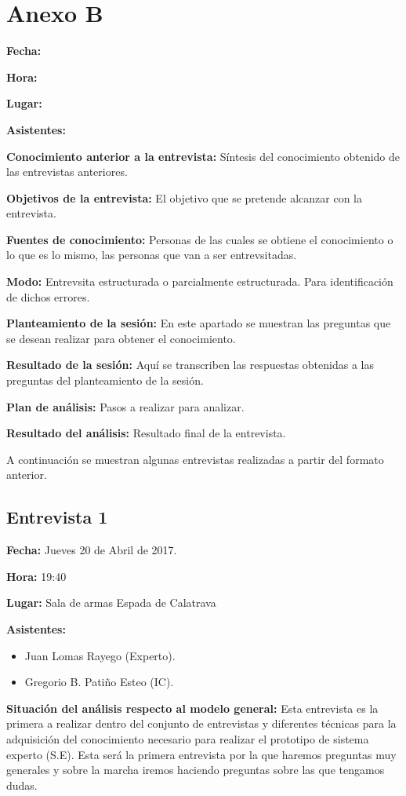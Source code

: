 \chapter{Anexo B}
\label{cap:Entrevsitas}

\textbf{Fecha:}


\textbf{Hora:}

\textbf{Lugar:}

\textbf{Asistentes:}

\textbf{Conocimiento anterior a la entrevista:} Síntesis del conocimiento obtenido
 de las entrevistas anteriores.

\textbf{Objetivos de la entrevista:} El objetivo que se pretende alcanzar con la entrevista.

\textbf{Fuentes de conocimiento:} Personas de las cuales se obtiene el conocimiento o
 lo que es lo mismo, las personas que van a ser entrevsitadas.

\textbf{Modo:} Entrevsita estructurada o parcialmente estructurada. Para identificación de
 dichos errores.

\textbf{Planteamiento de la sesión:} En este apartado se muestran las preguntas que se desean
 realizar para obtener el conocimiento.

\textbf{Resultado de la sesión:} Aquí se transcriben las respuestas obtenidas a las preguntas
 del planteamiento de la sesión.

\textbf{Plan de análisis:} Pasos a realizar para analizar.

\textbf{Resultado del análisis:} Resultado final de la entrevista.


A continuación se muestran algunas entrevistas realizadas a partir del formato anterior.

\section{Entrevista 1}

\textbf{Fecha:} Jueves 20 de Abril de 2017.

\textbf{Hora:} 19:40

\textbf{Lugar:} Sala de armas Espada de Calatrava

\textbf{Asistentes:}
  \begin{itemize}
    \item Juan Lomas Rayego (Experto).
    \item Gregorio B. Patiño Esteo (IC).
  \end{itemize}

\textbf{Situación del análisis respecto al modelo general:} Esta entrevista es la primera a realizar dentro del conjunto de entrevistas y diferentes técnicas
 para la adquisición del conocimiento necesario para realizar el prototipo de sistema experto
 (S.E). Esta será la primera entrevista por la que haremos preguntas muy generales y sobre la
 marcha iremos haciendo preguntas sobre las que tengamos dudas.

